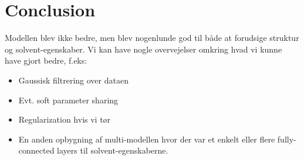 \section{Conclusion}
Modellen blev ikke bedre, men blev nogenlunde god til både at forudsige struktur og solvent-egenskaber.
Vi kan have nogle overvejelser omkring hvad vi kunne have gjort bedre, f.eks:
\begin{itemize}
\item Gaussisk filtrering over dataen
\item Evt. soft parameter sharing
\item Regularization hvis vi tør
\item En anden opbygning af multi-modellen hvor der var et enkelt eller flere fully-connected layers til solvent-egenskaberne.
\end{itemize}

